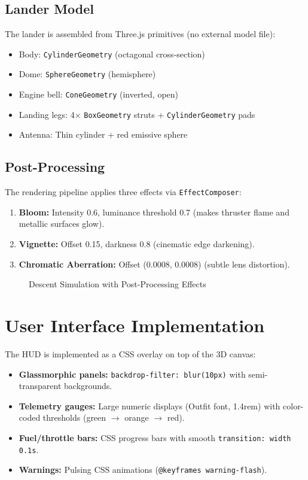 \subsection{Lander Model}
The lander is assembled from Three.js primitives (no external model file):
\begin{itemize}
    \item Body: \texttt{CylinderGeometry} (octagonal cross-section)
    \item Dome: \texttt{SphereGeometry} (hemisphere)
    \item Engine bell: \texttt{ConeGeometry} (inverted, open)
    \item Landing legs: 4$\times$ \texttt{BoxGeometry} struts + \texttt{CylinderGeometry} pads
    \item Antenna: Thin cylinder + red emissive sphere
\end{itemize}

\subsection{Post-Processing}
The rendering pipeline applies three effects via \texttt{EffectComposer}:
\begin{enumerate}
    \item \textbf{Bloom:} Intensity 0.6, luminance threshold 0.7 (makes thruster flame and metallic surfaces glow).
    \item \textbf{Vignette:} Offset 0.15, darkness 0.8 (cinematic edge darkening).
    \item \textbf{Chromatic Aberration:} Offset (0.0008, 0.0008) (subtle lens distortion).
\end{enumerate}

\begin{figure}[h]
\centering
{}
\caption{Descent Simulation with Post-Processing Effects}
\label{fig:descent}
\end{figure}

\section{User Interface Implementation}
The HUD is implemented as a CSS overlay on top of the 3D canvas:
\begin{itemize}
    \item \textbf{Glassmorphic panels:} \texttt{backdrop-filter: blur(10px)} with semi-transparent backgrounds.
    \item \textbf{Telemetry gauges:} Large numeric displays (Outfit font, 1.4rem) with color-coded thresholds (green $\rightarrow$ orange $\rightarrow$ red).
    \item \textbf{Fuel/throttle bars:} CSS progress bars with smooth \texttt{transition: width 0.1s}.
    \item \textbf{Warnings:} Pulsing CSS animations (\texttt{@keyframes warning-flash}).
\end{itemize}
